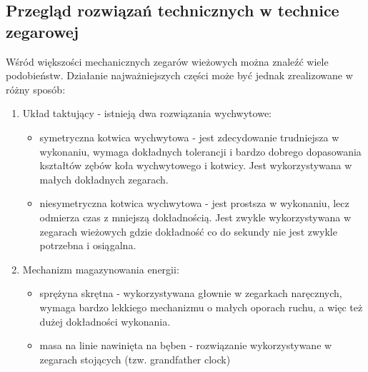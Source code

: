         \subsection{Przegląd rozwiązań technicznych w technice zegarowej}
        Wśród większości mechanicznych zegarów wieżowych można znaleźć wiele podobieństw.
        Działanie najważniejszych części może być jednak zrealizowane w różny sposób:
        \begin{enumerate}
        	\item Układ taktujący - istnieją dwa rozwiązania wychwytowe:
        	\begin{itemize}
        		\item symetryczna kotwica wychwytowa - jest zdecydowanie trudniejsza w wykonaniu, wymaga dokładnych tolerancji i bardzo dobrego dopasowania kształtów zębów koła wychwytowego i kotwicy. Jest wykorzystywana w małych dokładnych zegarach.
        		\item niesymetryczna kotwica wychwytowa - jest prostsza w wykonaniu, lecz odmierza czas z mniejszą dokładnością. Jest zwykle wykorzystywana w zegarach wieżowych gdzie dokładność co do sekundy nie jest zwykle potrzebna i osiągalna.
        	\end{itemize}
        \item Mechanizm magazynowania energii:
			\begin{itemize}
				\item sprężyna skrętna - wykorzystywana głownie w zegarkach naręcznych, wymaga bardzo lekkiego mechanizmu o małych oporach ruchu, a więc też dużej dokładności wykonania.
				\item masa na linie nawinięta na bęben - rozwiązanie wykorzystywane w zegarach stojących (tzw. grandfather clock)
			\end{itemize}
       	\end{enumerate}	


